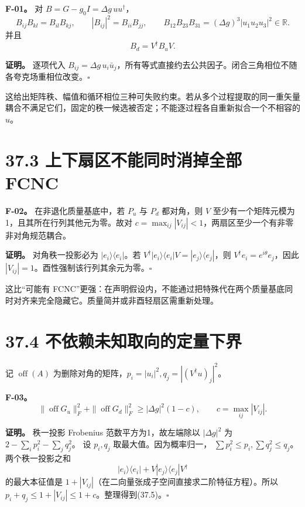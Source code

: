 \documentclass[
  11pt,
  oneside]{book}
\begin{document}
\protect\hypertarget{f-01}{}{}

\textbf{F-01。} 对 \(B=G-g_0I=\Delta g\,uu^\dagger\)， \[
B_{ij}B_{kl}=B_{il}B_{kj},\qquad
|B_{ij}|^2=B_{ii}B_{jj},\qquad
B_{12}B_{23}B_{31}=(\Delta g)^3|u_1u_2u_3|^2\in\mathbb R.
\tag{37.3}
\] 并且 \[
B_d=V^\dagger B_uV.
\tag{37.4}
\]

\textbf{证明。} 逐项代入
\(B_{ij}=\Delta g\,u_i\bar u_j\)，所有等式直接约去公共因子。闭合三角相位不随各夸克场重相位改变。\(\square\)

这给出矩阵秩、幅值和循环相位三种可失败约束。若从多个过程提取的同一重矢量耦合不满足它们，固定的秩一候选被否定；不能逐过程各自重新拟合一个不相容的
\(u\)。

\section{37.3 上下扇区不能同时消掉全部 FCNC}

\protect\hypertarget{f-02}{}{}

\textbf{F-02。} 在非退化质量基底中，若 \(P_u\) 与 \(P_d\) 都对角，则
\(V\) 至少有一个矩阵元模为1，且其所在行列其他元为零。故对
\(c=\max_{ij}|V_{ij}|<1\)，两扇区至少一个有非零非对角规范耦合。

\textbf{证明。} 对角秩一投影必为 \(|e_i\rangle\langle e_i|\)。若
\(V^\dagger|e_i\rangle\langle e_i|V=|e_j\rangle\langle e_j|\)，则
\(V^\dagger e_i=e^{i\theta}e_j\)，因此
\(|V_{ij}|=1\)。酉性强制该行列其余元为零。\(\square\)

这比``可能有
FCNC''更强：在声明假设内，不能通过把特殊代在两个质量基底同时对齐来完全隐藏它。质量简并或非酉轻扇区需重新处理。

\section{37.4 不依赖未知取向的定量下界}

记 \(\operatorname{off}(A)\)
为删除对角的矩阵，\(p_i=|u_i|^2,q_j=|(V^\dagger u)_j|^2\)。

\protect\hypertarget{f-03}{}{}

\textbf{F-03。} \[
\|\operatorname{off}G_u\|_F^2+
\|\operatorname{off}G_d\|_F^2
\ge |\Delta g|^2(1-c),\qquad c=\max_{ij}|V_{ij}|.
\tag{37.5}
\]

\textbf{证明。} 秩一投影 Frobenius 范数平方为1，故左端除以
\(|\Delta g|^2\) 为 \(2-\sum_i p_i^2-\sum_jq_j^2\)。 设 \(p_i,q_j\)
取最大值。因为概率归一， \(\sum p_i^2\le p_i,\sum q_j^2\le q_j\)。
两个秩一投影之和 \[
|e_i\rangle\langle e_i|+
V|e_j\rangle\langle e_j|V^\dagger
\] 的最大本征值是
\(1+|V_{ij}|\)（在二向量张成子空间直接求二阶特征方程）。所以
\(p_i+q_j\le1+|V_{ij}|\le1+c\)。整理得到(37.5)。\(\square\)
\end{document}
